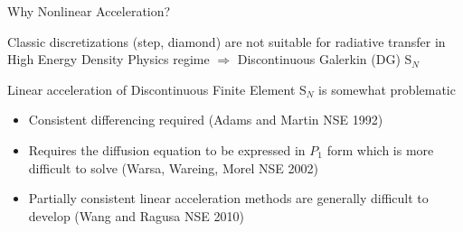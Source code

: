 \documentclass[10pt]{beamer}
\newcommand{\SN}{S$_N$\xspace}
\begin{document}
\begin{frame}{Why Nonlinear Acceleration?}


		Classic discretizations (step, diamond) are not suitable for radiative transfer in High Energy Density Physics regime $\Rightarrow$ Discontinuous Galerkin (DG) \SN

		Linear acceleration of Discontinuous Finite Element \SN is somewhat problematic 
		\begin{itemize}
			\item Consistent differencing required (Adams and Martin NSE 1992)

			\item Requires the diffusion equation to be expressed in $P_1$ form which is more difficult to solve (Warsa, Wareing, Morel NSE 2002) 

			\item Partially consistent linear acceleration methods are generally difficult to develop (Wang and Ragusa NSE 2010)

		\end{itemize}


\end{frame}
\end{document}
